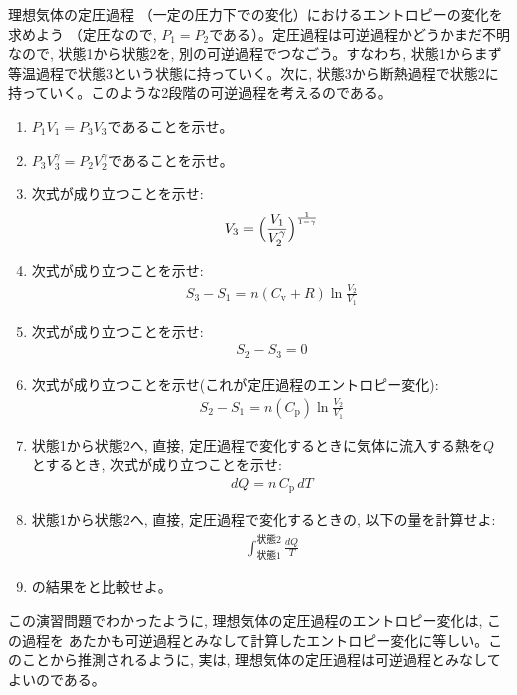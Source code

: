\begin{exq}\label{exq:entropy_constP} 理想気体の定圧過程
（一定の圧力下での変化）におけるエントロピーの変化を求めよう
（定圧なので, $P_1=P_2$である）。定圧過程は可逆過程かどうかまだ不明なので, 状態1から状態2を, 
別の可逆過程でつなごう。すなわち, 状態1からまず等温過程で状態3という状態に持っていく。次に, 
状態3から断熱過程で状態2に持っていく。このような2段階の可逆過程を考えるのである。
\begin{enumerate}
\item $P_1V_1=P_3V_3$であることを示せ。
\item $P_3V_3^{\gamma}=P_2V_2^{\gamma}$であることを示せ。
\item 次式が成り立つことを示せ:
\begin{eqnarray}
V_3=\Bigl(\frac{V_1}{V_2^{\gamma}}\Bigr)^{\frac{1}{1-\gamma}}
\end{eqnarray}
\item 次式が成り立つことを示せ:
\begin{eqnarray}
S_3-S_1=n(C_{\text{v}}+R)\ln \frac{V_2}{V_1}
\end{eqnarray}
\item 次式が成り立つことを示せ:
\begin{eqnarray}
S_2-S_3=0
\end{eqnarray}
\item 次式が成り立つことを示せ(これが定圧過程のエントロピー変化):
\begin{eqnarray}
S_2-S_1=n(C_{\text{p}})\ln \frac{V_2}{V_1}\label{eq:entropy_constP6}
\end{eqnarray}
\item 状態1から状態2へ, 直接, 定圧過程で変化するときに気体に流入する熱を$Q$
とするとき, 次式が成り立つことを示せ:
\begin{eqnarray}
dQ=n\,C_{\text{p}}\,dT
\end{eqnarray}
\item 状態1から状態2へ, 直接, 定圧過程で変化するときの, 以下の量を計算せよ:
\begin{eqnarray}
\int_{\text{状態1}}^{\text{状態2}} \frac{dQ}{T}\label{eq:entropy_constP8}
\end{eqnarray}
\item {}の結果をと比較せよ。
\end{enumerate}
\end{exq}

この演習問題でわかったように, 理想気体の定圧過程のエントロピー変化は, この過程を
あたかも可逆過程とみなして計算したエントロピー変化に等しい。このことから推測されるように, 
実は, 理想気体の定圧過程は可逆過程とみなしてよいのである。

